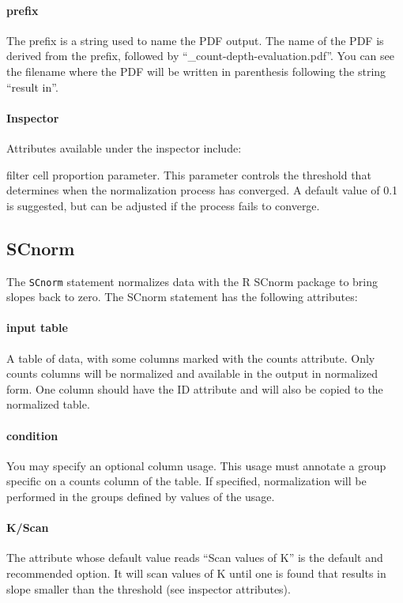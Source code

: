 \paragraph{prefix}
The prefix is a string used to name the PDF output. The name of the PDF is derived from the prefix, followed by ``\_count-depth-evaluation.pdf''. You can see the filename where the PDF will be written in parenthesis following the string ``result in''.
\paragraph{Inspector}
Attributes available under the inspector include:

\subparagrah filter cell proportion parameter. This parameter controls the threshold that determines when the normalization process has converged. A default value of 0.1 is suggested, but can be adjusted if the process fails to converge.

\subsection{SCnorm}
The \texttt{SCnorm} statement  normalizes data with the R SCnorm package to bring slopes back to zero. The SCnorm statement has the following attributes:
\paragraph{input table}
A table of data, with some columns marked with the counts attribute. Only counts columns will be normalized and available in the output in normalized form. One column should have the ID attribute and will also be copied to the normalized table.

\paragraph{condition}
You may specify an optional column usage. This usage must annotate a group specific on a counts column of the table. If specified, normalization will be performed in the groups defined by values of the usage.
\paragraph{K/Scan}
The attribute whose default value reads ``Scan values of K'' is the default and recommended option. It will scan values of K until one is found that results in slope smaller than the threshold (see inspector attributes).

